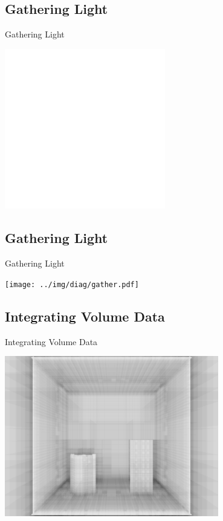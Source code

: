 \documentclass[compress,professionalfont]{beamer}
\begin{document}
\subsection{Gathering Light}
\begin{frame}{Gathering Light}

    \centering
    \includegraphics[height=70mm]{../img/diag/orthnormal.pdf}

\end{frame}




\subsection{Gathering Light}
\begin{frame}{Gathering Light}

    \centering
    \texttt{[image: ../img/diag/gather.pdf]}

\end{frame}




\subsection{Integrating Volume Data}
\begin{frame}{Integrating Volume Data}

    \centering
    \includegraphics[height=70mm]{../img/testing.png}

\end{frame}
\end{document}
